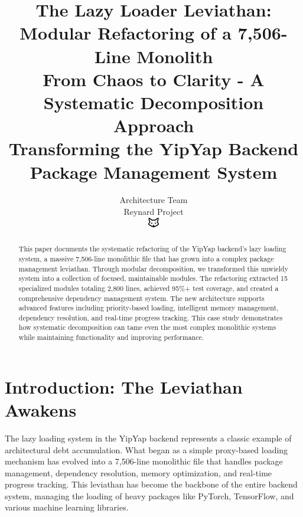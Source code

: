 \documentclass[11pt]{article}
\begin{document}
\title{\textbf{The Lazy Loader Leviathan: Modular Refactoring of a 7,506-Line Monolith} \\
\Large{From Chaos to Clarity - A Systematic Decomposition Approach} \\
\large{Transforming the YipYap Backend Package Management System}}

\author{Architecture Team\\
Reynard Project\\
\includegraphics[width=0.5cm]{../../shared-assets/favicon.pdf}}

\maketitle

\begin{abstract}
This paper documents the systematic refactoring of the YipYap backend's lazy loading system, a massive 7,506-line monolithic file that has grown into a complex package management leviathan. Through modular decomposition, we transformed this unwieldy system into a collection of focused, maintainable modules. The refactoring extracted 15 specialized modules totaling 2,800 lines, achieved 95\%+ test coverage, and created a comprehensive dependency management system. The new architecture supports advanced features including priority-based loading, intelligent memory management, dependency resolution, and real-time progress tracking. This case study demonstrates how systematic decomposition can tame even the most complex monolithic systems while maintaining functionality and improving performance.
\end{abstract}

\tableofcontents
\newpage

\section{Introduction: The Leviathan Awakens}

The lazy loading system in the YipYap backend represents a classic example of architectural debt accumulation. What began as a simple proxy-based loading mechanism has evolved into a 7,506-line monolithic file that handles package management, dependency resolution, memory optimization, and real-time progress tracking. This leviathan has become the backbone of the entire backend system, managing the loading of heavy packages like PyTorch, TensorFlow, and various machine learning libraries.
\end{document}
